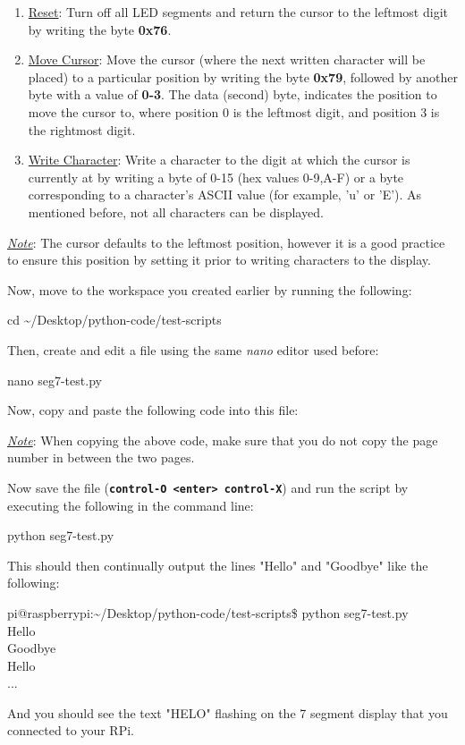 \documentclass{article}
\newcommand*{\myfont}{\fontfamily{pcr}\selectfont}
\newcommand{\codeb}[2]{
  \begin{tcolorbox}[width=\textwidth,colback={SpringGreen},title={#1},colbacktitle=darkgreen,coltitle=SpringGreen]
    \myfont
    #2
  \end{tcolorbox}
} %
\newcommand{\outputb}[2]{
  \begin{tcolorbox}[width=\textwidth,colback={light-gray},title={#1},colbacktitle=gray,coltitle=light-gray]
    \myfont
    #2
  \end{tcolorbox}
} %
\newcommand{\note}[1]{\underline{\textit{Note}}: #1}
\begin{document}
  \begin{enumerate}
    \item \underline{Reset}: Turn off all LED segments and return the cursor to the leftmost digit by writing the byte \textbf{0x76}.
    \item \underline{Move Cursor}: Move the cursor (where the next written character will be placed) to a particular position by writing the byte \textbf{0x79}, followed by another byte with a value of \textbf{0-3}. The data (second) byte, indicates the position to move the cursor to, where position 0 is the leftmost digit, and position 3 is the rightmost digit.
    \item \underline{Write Character}: Write a character to the digit at which the cursor is currently at by writing a byte of 0-15 (hex values 0-9,A-F) or a byte corresponding to a character's ASCII value (for example, 'u' or 'E'). As mentioned before, not all characters can be displayed.
  \end{enumerate}

  \linebreak
  \newline
  \underline{\textit{Note}}: The cursor defaults to the leftmost position, however it is a good practice to ensure this position by setting it prior to writing characters to the display.
  \newline
  \noindent

  Now, move to the workspace you created earlier by running the following:
  \codeb{Navigate to your workspace}
  {
    cd \textasciitilde/Desktop/python-code/test-scripts
  }
  \newline
  \noindent
  Then, create and edit a file using the same \textit{nano} editor used before:
  \codeb{Create seg7 Python testing script file}
  {
    nano seg7-test.py
  }
  \newline
  \noindent
  Now, copy and paste the following code into this file:
  
  \note{When copying the above code, make sure that you do not copy the page number in between the two pages.}

  \newline
  \noindent
  Now save the file (\textbf{\texttt{control-O <enter> control-X}}) and run the script by executing the following in the command line:
  \codeb{Run the test script for seg7 sensor}{python seg7-test.py}
  This should then continually output the lines "Hello" and "Goodbye" like the following:
  \outputb{Test script output for seg7 sensor}
  {
    pi@raspberrypi:\textasciitilde/Desktop/python-code/test-scripts\$ python seg7-test.py        \\
    Hello                                   \\
    Goodbye                                   \\
    Hello                                   \\
    ...
  }
  And you should see the text "HELO" flashing on the 7 segment display that you connected to your RPi.
\end{document}
